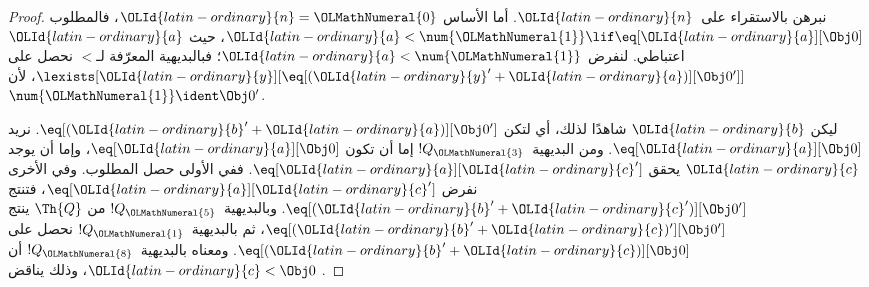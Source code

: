 \documentclass[../../../include/open-logic-section]{subfiles}
\begin{document}
\begin{proof}
نبرهن بالاستقراء على~${\OLId{latin-ordinary}{n}}$. أما الأساس ${\OLId{latin-ordinary}{n}}={\OLMathNumeral{0}}$، فالمطلوب
${\OLId{latin-ordinary}{a}}<\num {\OLMathNumeral{1}}\lif\eq[{\OLId{latin-ordinary}{a}}][\Obj 0]$، حيث ${\OLId{latin-ordinary}{a}}$ اعتباطي.
لنفرض ${\OLId{latin-ordinary}{a}}<\num {\OLMathNumeral{1}}$؛ فبالبديهية المعرّفة لـ$<$ نحصل على
$\lexists[{\OLId{latin-ordinary}{y}}][\eq[({\OLId{latin-ordinary}{y}}'+{\OLId{latin-ordinary}{a}})][\Obj 0']]$، لأن
$\num {\OLMathNumeral{1}}\ident\Obj 0'$.

ليكن ${\OLId{latin-ordinary}{b}}$ شاهدًا لذلك، أي لتكن
$\eq[({\OLId{latin-ordinary}{b}}'+{\OLId{latin-ordinary}{a}})][\Obj 0']$. نريد $\eq[{\OLId{latin-ordinary}{a}}][\Obj 0]$.
ومن البديهية~$!Q_{\OLMathNumeral{3}}$ إما أن تكون $\eq[{\OLId{latin-ordinary}{a}}][\Obj 0]$،
وإما أن يوجد ${\OLId{latin-ordinary}{c}}$ يحقق $\eq[{\OLId{latin-ordinary}{a}}][{\OLId{latin-ordinary}{c}}']$.
ففي الأولى حصل المطلوب. وفي الأخرى نفرض $\eq[{\OLId{latin-ordinary}{a}}][{\OLId{latin-ordinary}{c}}']$،
فتنتج $\eq[({\OLId{latin-ordinary}{b}}'+{\OLId{latin-ordinary}{c}}')][\Obj 0']$.
وبالبديهية~$!Q_{\OLMathNumeral{5}}$ من $\Th{Q}$ ينتج
$\eq[({\OLId{latin-ordinary}{b}}'+{\OLId{latin-ordinary}{c}})'][\Obj 0']$، ثم بالبديهية~$!Q_{\OLMathNumeral{1}}$ نحصل على
$\eq[({\OLId{latin-ordinary}{b}}'+{\OLId{latin-ordinary}{c}})][\Obj 0]$. ومعناه بالبديهية~$!Q_{\OLMathNumeral{8}}$ أن
${\OLId{latin-ordinary}{c}}<\Obj 0$، وذلك يناقض .


\end{proof}
\end{document}
